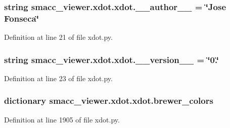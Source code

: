 \subsubsection[{\texorpdfstring{\+\_\+\+\_\+author\+\_\+\+\_\+}{__author__}}]{\setlength{\rightskip}{0pt plus 5cm}string smacc\+\_\+viewer.\+xdot.\+xdot.\+\_\+\+\_\+author\+\_\+\+\_\+ = \char`\"{}Jose Fonseca\char`\"{}\hspace{0.3cm}{\ttfamily [private]}}\hypertarget{namespacesmacc__viewer_1_1xdot_1_1xdot_a234165ccf5d9631b02455791198afde7}{}\label{namespacesmacc__viewer_1_1xdot_1_1xdot_a234165ccf5d9631b02455791198afde7}


Definition at line 21 of file xdot.\+py.

\subsubsection[{\texorpdfstring{\+\_\+\+\_\+version\+\_\+\+\_\+}{__version__}}]{\setlength{\rightskip}{0pt plus 5cm}string smacc\+\_\+viewer.\+xdot.\+xdot.\+\_\+\+\_\+version\+\_\+\+\_\+ = \char`\"{}0.\char`\"{}\hspace{0.3cm}{\ttfamily [private]}}\hypertarget{namespacesmacc__viewer_1_1xdot_1_1xdot_a75be66802b57d9038ac4cfe1c1015d89}{}\label{namespacesmacc__viewer_1_1xdot_1_1xdot_a75be66802b57d9038ac4cfe1c1015d89}


Definition at line 23 of file xdot.\+py.

\subsubsection[{\texorpdfstring{brewer\+\_\+colors}{brewer_colors}}]{\setlength{\rightskip}{0pt plus 5cm}dictionary smacc\+\_\+viewer.\+xdot.\+xdot.\+brewer\+\_\+colors}\hypertarget{namespacesmacc__viewer_1_1xdot_1_1xdot_a4e938691ee767d9968aa3ff89a6a88a5}{}\label{namespacesmacc__viewer_1_1xdot_1_1xdot_a4e938691ee767d9968aa3ff89a6a88a5}


Definition at line 1905 of file xdot.\+py.

